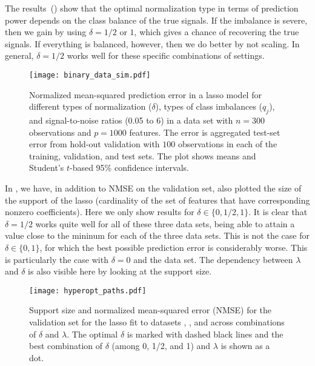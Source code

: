 The results~() show that the optimal normalization type in terms of
prediction power depends on the class balance of the true signals. If the imbalance is
severe, then we gain by using \(\delta=1/2\) or \(1\), which gives a chance of recovering
the true signals. If everything is balanced, however, then we do better by not scaling. In
general, \(\delta=1/2\) works well for these specific combinations of settings.

\begin{figure}[htpb]
  \centering
  \texttt{[image: binary\_data\_sim.pdf]}
  \caption{%
    Normalized mean-squared prediction error in a lasso model for different types of
    normalization (\(\delta\)), types of class imbalances (\(q_j\)), and signal-to-noise ratios
    (0.05 to 6) in a data set with \(n=300\) observations and \(p = \num{1000}\) features. The
    error is aggregated test-set error from hold-out validation with \(100\) observations in
    each of the training, validation, and test sets. The plot shows means and Student's
    \(t\)-based 95\% confidence intervals. } \label{fig:binary-sim}
\end{figure}

In , we have, in addition to NMSE on the validation set, also
plotted the size of the support of the lasso (cardinality of the set of features that have
corresponding nonzero coefficients). Here we only show results for \(\delta \in \{0, 1/2,
1\}\). It is clear that \(\delta = 1/2\) works quite well for all of these three data sets,
being able to attain a value close to the mininum for each of the three data sets. This is
not the case for \(\delta \in \{0, 1\}\), for which the best possible prediction error is
considerably worse. This is particularly the case with \(\delta =0\) and the 
data set. The dependency between \(\lambda\) and \(\delta\) is also visible here by looking
at the support size.

\begin{figure}[htpb]
  \centering
  \texttt{[image: hyperopt\_paths.pdf]}
  \caption{%
    Support size and normalized mean-squared error (NMSE) for the validation set for the lasso
    fit to datasets , , and  across combinations of
    \(\delta\) and \(\lambda\). The optimal \(\delta\) is marked with dashed black lines and
    the best combination of \(\delta\) (among 0, 1/2, and 1) and \(\lambda\) is shown as a dot.
  }
  \label{fig:hyperopt-support}
\end{figure}

